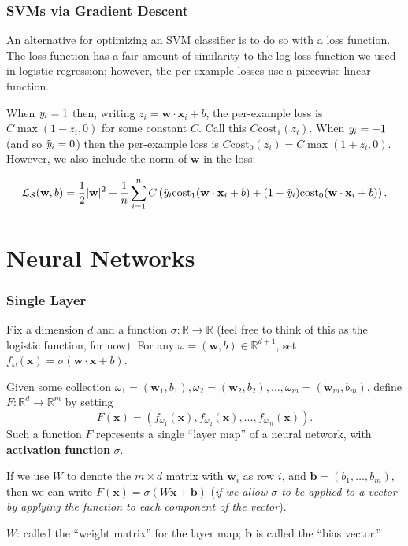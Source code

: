 \documentclass[smaller]{beamer}
\theoremstyle{example}
\newcommand{\x}{\textbf{x}}
\newcommand{\ix}[1]{{\it #1}}
\begin{document}
\begin{frame}
    \frametitle{SVMs via Gradient Descent}
    An alternative for optimizing an SVM classifier is to do so with a loss function. The loss function has a fair amount of similarity to the log-loss function we used in logistic regression; however, the per-example losses use a piecewise linear function.

    \pause
    When $\ix y_i = 1$ then, writing $z_i = \textbf{w}\cdot\x_i + b$, the per-example loss is $C\max(1-z_i, 0)$ for some constant $C$. Call this $C\text{cost}_1(z_i)$. When $\ix y_i=-1$ (and so $\tilde{\ix y}_i = 0$) then the per-example loss is $C\text{cost}_0(z_i) = C\max(1+z_i, 0)$.\ \pause
    However, we also include the norm of $\textbf{w}$ in the loss: 

    \[\mathcal L_{\mathcal S}(\textbf{w}, b) = \frac12|\textbf{w}|^2 + \frac{1}{n}\sum_{i=1}^nC\left(\tilde{\ix y}_i\text{cost}_1(\textbf{w}\cdot\x_i + b) + (1 - \tilde{\ix y}_i)\text{cost}_0(\textbf{w}\cdot\x_i + b)\right).\]
\end{frame}

\section{Neural Networks}

\begin{frame}
    \frametitle{Single Layer}
    Fix a dimension $d$ and a function $\sigma:\mathbb R\to\mathbb R$ (feel free to think of this as the logistic function, for now). For any $\omega = (\textbf{w}, b) \in \mathbb R^{d+1}$, set $f_{\omega}(\x) = \sigma(\textbf{w}\cdot\x + b)$.
    \pause

    Given some collection $\omega_1=(\textbf{w}_1,b_1), \omega_2=(\textbf{w}_2,b_2), \ldots, \omega_{m}=(\textbf{w}_m,b_m)$, define $F:\mathbb R^d \to \mathbb R^m$ by setting 
            \[F(\x) = (f_{\omega_1}(\x), f_{\omega_2}(\x), \ldots, f_{\omega_m}(\x)).\]
    Such a function $F$ represents a single ``layer map'' of a neural network, with {\bf activation function} $\sigma$. 
    \pause 

    If we use $W$ to denote the $m\times d$ matrix with $\textbf{w}_i$ as row $i$, and $\textbf{b} = (b_1,\ldots,b_m)$, then we can write $F(\x) = \sigma(W\x + \textbf{b})$ (\textit{if we allow $\sigma$ to be applied to a vector by applying the function to each component of the vector}).
    
    \pause
    $W$: called the ``weight matrix'' for the layer map; $\textbf{b}$ is called the ``bias vector.''
\end{frame}
\end{document}
